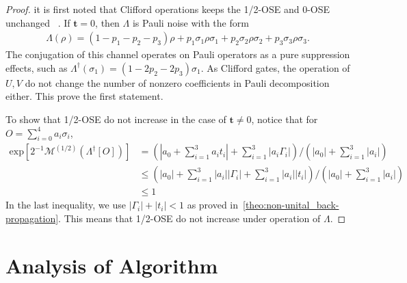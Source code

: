 \documentclass[aps,%
twocolumn,%
floatfix,%
pra,%
amsfonts,%
longbibliography,%
groupedaddress,%
superscriptaddress]{revtex4-2}%
\newcommand{\1}{\mathbbm{1}}
\begin{document}
\begin{proof}
it is first noted that Clifford operations keeps the  1/2-OSE and 0-OSE unchanged~\cite{dowling2024magic} . 
If  $\mathbf{t} = 0$, then $\Lambda$ is Pauli noise with the form
\begin{align}
    \Lambda(\rho) = (1- p_1 - p_2- p_3) \rho + p_1 \sigma_1 \rho \sigma_1 + p_2 \sigma_2 \rho \sigma_2+ p_3 \sigma_3 \rho \sigma_3.
\end{align}
The conjugation of this channel operates on Pauli operators as a pure suppression effects, such as $\Lambda^\dagger(\sigma_1) = (1 -2p_2-2p_3 )\sigma_1$. As Clifford gates, the operation of $U,V$ do not change the number of nonzero coefficients in Pauli decomposition either. This prove the first statement.

To show that 1/2-OSE do not increase in the case of $\mathbf{t} \neq 0$, notice that for $O = \sum_{i = 0}^4 a_i\sigma_i$,
\begin{align}
    \text{exp}\left[2^{-1}\mathcal{M}^{(1/2)}(\Lambda^\dagger [O])\right] &= \left(|a_0 +\sum_{i =1}^3 a_i t_i|  + \sum_{i = 1}^3 |a_i \Gamma_i| \right)/\left(|a_0| +\sum_{i=1}^3 |a_i|\right)\\
    &\leq \left(|a_0| + \sum_{i=1}^3 |a_i||\Gamma_i| + \sum_{i =1}^3 |a_i||t_i|\right)/ \left(|a_0| + \sum_{i=1}^3 |a_i|\right)\\
    &\leq 1 
\end{align} 
In the last inequality, we use $|\Gamma_i| + |t_i| < 1$ as proved in~\ref{theo:non-unital_back-propagation}. This means that 1/2-OSE do not increase under operation of $\Lambda$. 
\end{proof}


\section{Analysis of Algorithm}
\label{app:analysis_alg}
\end{document}

